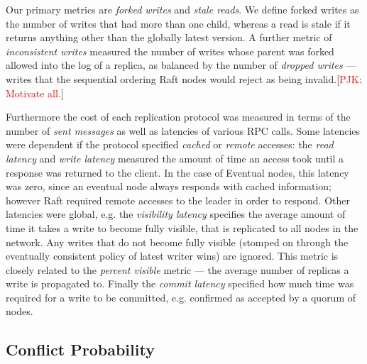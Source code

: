\documentclass[10pt,conference,letterpaper]{IEEEtran}
\newcommand{\todo}[1]{{\textcolor{red}{#1}}}
\newcommand{\pjk}[1]{[\todo{PJK: #1}]}
\begin{document}
Our primary metrics are \textit{forked writes} and \textit{stale reads}. We define forked writes as the number of writes that had more than one child, whereas a read is stale if it returns anything other than the globally latest version. A further metric of \textit{inconsistent writes} measured the number of writes whose parent was forked allowed into the log of a replica, as balanced by the number of \textit{dropped writes} --- writes that the sequential ordering Raft nodes would reject as being invalid.\pjk{Motivate all.}

Furthermore the cost of each replication protocol was measured in terms of the number of \textit{sent messages} as well as latencies of various RPC calls. Some latencies were dependent if the protocol specified \textit{cached} or \textit{remote} accesses: the \textit{read latency} and \textit{write latency} measured the amount of time an access took until a response was returned to the client. In the case of Eventual nodes, this latency was zero, since an eventual node always responds with cached information; however Raft required remote accesses to the leader in order to respond. Other latencies were global, e.g. the \textit{visibility latency} specifies the average amount of time it takes a write to become fully visible, that is replicated to all nodes in the network. Any writes that do not become fully visible (stomped on through the eventually consistent policy of latest writer wins) are ignored. This metric is closely related to the \textit{percent visible} metric --- the average number of replicas a write is propagated to. Finally the \textit{commit latency} specified how much time was required for a write to be committed, e.g. confirmed as accepted by a quorum of nodes.

\subsection{Conflict Probability}
\end{document}
